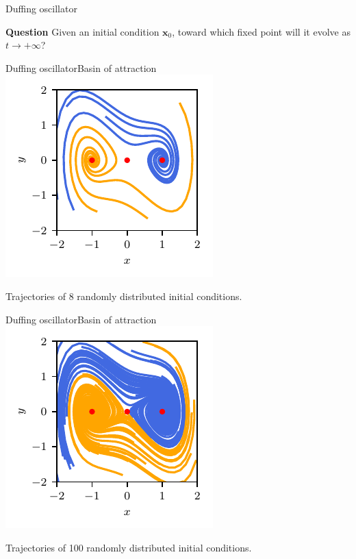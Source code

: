 \documentclass[usenames,dvipsnames,svgnames,10pt,aspectratio=169]{beamer}
\begin{document}
\begin{frame}[t, c]{Duffing oscillator}{}
	\centering

	\begin{block}{\centering \textbf{Question}}
		\centering
		Given an initial condition ${\bm x}_0$, toward which fixed point will it evolve as $t \to +\infty$?
	\end{block}

	\vspace{1cm}
\end{frame}

\begin{frame}[t, c]{Duffing oscillator}{Basin of attraction}
	\centering
	\includegraphics[width=.375\textwidth]{duffing_oscillator_basin}

	Trajectories of 8 randomly distributed initial conditions.

	\vspace{1cm}
\end{frame}

\begin{frame}[t, c]{Duffing oscillator}{Basin of attraction}
	\centering
	\includegraphics[width=.375\textwidth]{duffing_oscillator_basin_bis}

	Trajectories of 100 randomly distributed initial conditions.

	\vspace{1cm}
\end{frame}
\end{document}
